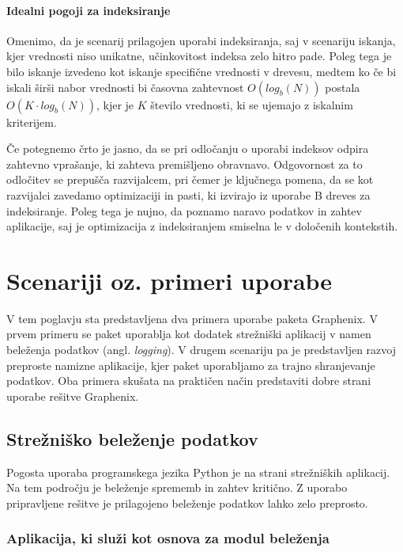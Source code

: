 \documentclass[a4paper,12pt,openright]{book}
\begin{document}
    \subsubsection{Idealni pogoji za indeksiranje}
    Omenimo, da je scenarij prilagojen uporabi indeksiranja, saj v scenariju iskanja, kjer vrednosti niso unikatne, učinkovitost indeksa zelo hitro pade. Poleg tega je bilo iskanje izvedeno kot iskanje specifične vrednosti v drevesu, medtem ko če bi iskali širši nabor vrednosti bi časovna zahtevnost $O(log_b(N))$ postala $O(K \cdot log_b(N))$, kjer je $K$ število vrednosti, ki se ujemajo z iskalnim kriterijem.

    Če potegnemo črto je jasno, da se pri odločanju o uporabi indeksov odpira zahtevno vprašanje, ki zahteva premišljeno obravnavo. Odgovornost za to odločitev se prepušča razvijalcem, pri čemer je ključnega pomena, da se kot razvijalci zavedamo optimizaciji in pasti, ki izvirajo iz uporabe B dreves za indeksiranje. Poleg tega je nujno, da poznamo naravo podatkov in zahtev aplikacije, saj je optimizacija z indeksiranjem smiselna le v določenih kontekstih.

\chapter{Scenariji oz. primeri uporabe}
\label{ch3}

    V tem poglavju sta predstavljena dva primera uporabe paketa Graphenix. V prvem primeru se paket uporablja kot dodatek strežniški aplikacij v namen beleženja podatkov (angl. \textit{logging}). V drugem scenariju pa je predstavljen razvoj preproste namizne aplikacije, kjer paket uporabljamo za trajno shranjevanje podatkov. Oba primera skušata na praktičen način predstaviti dobre strani uporabe rešitve Graphenix.

    \section{Strežniško beleženje podatkov}

    Pogosta uporaba programskega jezika Python je na strani strežniških aplikacij. Na tem področju je beleženje sprememb in zahtev kritično. Z uporabo pripravljene rešitve je prilagojeno beleženje podatkov lahko zelo preprosto.

    \subsection{Aplikacija, ki služi kot osnova za modul beleženja}
\end{document}
